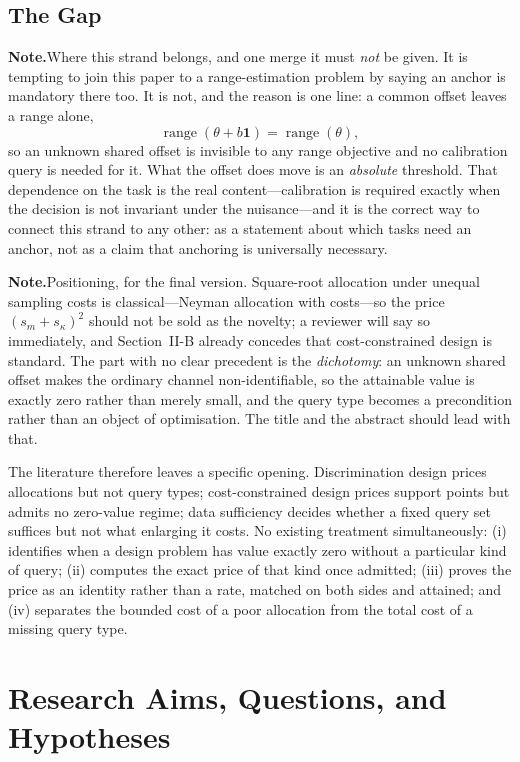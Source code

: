 \documentclass[conference]{IEEEtran}
\theoremstyle{definition}
\newif\ifshownotes\shownotestrue
\newcommand{\NOTEPAR}[1]{\ifshownotes\par\vspace{2pt}\noindent%
  {\color{notecol}\textsf{\footnotesize\textbf{Note.}\;#1}}\par\vspace{2pt}\fi}
\begin{document}
\subsection{The Gap}
\NOTEPAR{Where this strand belongs, and one merge it must \emph{not} be given. It is
tempting to join this paper to a range-estimation problem by saying an anchor is mandatory
there too. It is not, and the reason is one line: a common offset leaves a range alone,
\[
\operatorname{range}(\theta+b\mathbf{1})=\operatorname{range}(\theta),
\]
so an unknown shared offset is invisible to any range objective and no calibration query is
needed for it. What the offset does move is an \emph{absolute} threshold. That dependence on
the task is the real content---calibration is required exactly when the decision is not
invariant under the nuisance---and it is the correct way to connect this strand to any
other: as a statement about which tasks need an anchor, not as a claim that anchoring is
universally necessary.}
\NOTEPAR{Positioning, for the final version. Square-root allocation under unequal
sampling costs is classical---Neyman allocation with costs---so the price
$(s_{m}+s_{\kappa})^{2}$ should not be sold as the novelty; a reviewer will say so
immediately, and Section~II-B already concedes that cost-constrained design is standard. The
part with no clear precedent is the \emph{dichotomy}: an unknown shared offset makes the
ordinary channel non-identifiable, so the attainable value is exactly zero rather than merely
small, and the query type becomes a precondition rather than an object of optimisation. The
title and the abstract should lead with that.}

The literature therefore leaves a specific opening. Discrimination design prices allocations
but not query types; cost-constrained design prices support points but admits no zero-value
regime; data sufficiency decides whether a fixed query set suffices but not what enlarging
it costs. No existing treatment simultaneously: (i) identifies when a design problem has
value exactly zero without a particular kind of query; (ii) computes the exact price of that
kind once admitted; (iii) proves the price as an identity rather than a rate, matched on
both sides and attained; and (iv) separates the bounded cost of a poor allocation from the
total cost of a missing query type.

\section{Research Aims, Questions, and Hypotheses}
\end{document}
